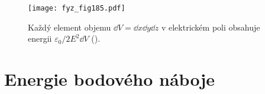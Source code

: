     \begin{figure}[ht!]  %
      \centering
      \texttt{[image: fyz\_fig185.pdf]}
      \caption{Každý element objemu \(\dd{V} = \dd{x}\dd{y}\dd{z}\) v elektrickém  poli obsahuje
      energii \(\varepsilon_0/2E^2\dd{V}\) (\cite[s.~154]{Feynman02}).}
      \label{fyz:fig185}
    \end{figure}
    
  \section{Energie bodového náboje}\label{fyz:IIchapVIsecVI}

